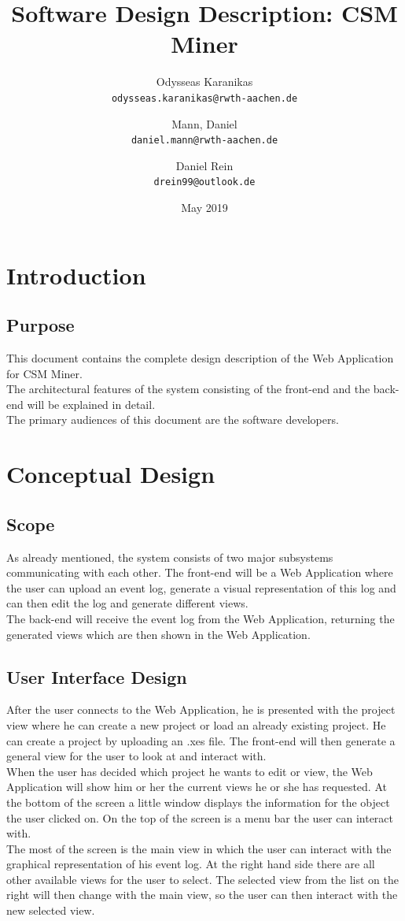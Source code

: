 \documentclass[12pt]{extarticle}
\title{Software Design Description: CSM Miner}
\author{
Odysseas Karanikas\\
\texttt{odysseas.karanikas@rwth-aachen.de}
\and
Mann, Daniel\\
\texttt{daniel.mann@rwth-aachen.de}
\and
Daniel Rein\\
\texttt{drein99@outlook.de}
}
\date{May 2019}
\begin{document}
\maketitle

\section{Introduction}
\subsection{Purpose}
This document contains the complete design description of the Web Application for CSM Miner. \\
The architectural features of the system consisting of the front-end and the back-end will be explained in detail. \\
The primary audiences of this document are the software developers. 

\section{Conceptual Design}

\subsection{Scope}
As already mentioned, the system consists of two major subsystems communicating with each other. The front-end will be a Web Application where the user can upload an event log, generate a visual representation of this log and can then edit the log and generate different views. \\
The back-end will receive the event log from the Web Application, returning the generated views which are then shown in the Web Application.

\subsection{User Interface Design}
After the user connects to the Web Application, he is presented with the project view where he can create a new project or load an already existing project. He can create a project by uploading an .xes file. The front-end will then generate a general view for the user to look at and interact with. \\
When the user has decided which project he wants to edit or view, the Web Application will show him or her the current views he or she has requested. At the bottom of the screen a little window displays the information for the object the user clicked on. On the top of the screen is a menu bar the user can interact with. \\
The most of the screen is the main view in which the user can interact with the graphical representation of his event log. At the right hand side there are all other available views for the user to select. The selected view from the list on the right will then change with the main view, so the user can then interact with the new selected view.
\end{document}
